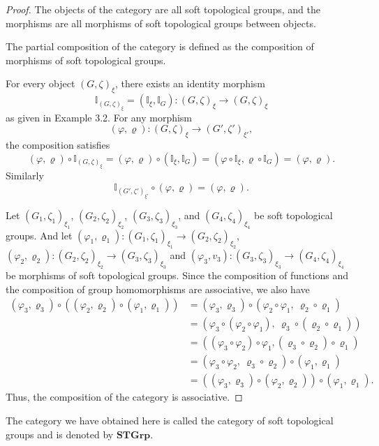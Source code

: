 \documentclass[preprint,12pt]{elsarticle}
\begin{document}
\begin{proof}
 The objects of the category are all soft topological groups, and the morphisms are all morphisms of soft topological groups  between objects.

The partial composition of the category is defined as the composition of morphisms of soft topological groups.

For every object $(G,\zeta)_\xi$, there exists an identity morphism
\[
\mathbb{I}_{ (G,\zeta)_\xi }=(\mathbb{I}_\xi, \mathbb{I}_G) : (G,\zeta)_\xi \longrightarrow (G,\zeta)_\xi
\]
as given in Example 3.2.
For any morphism
\[
(\varphi, \varrho) : (G,\zeta)_\xi  \to ( G',\zeta')_{\xi'} ,
\]
the composition satisfies
\[(\varphi, \varrho) \circ \mathbb{I}_{(G,\zeta)_\xi } = (\varphi, \varrho) \circ(\mathbb{I}_\xi, \mathbb{I}_G)  = (\varphi \circ \mathbb{I}_\xi, \varrho \circ \mathbb{I}_G) = (\varphi, \varrho).\]
Similarly
\[\mathbb{I}_{( G',\zeta')_{\xi'}} \circ (\varphi, \varrho) =(\varphi, \varrho).\]

 Let  \( (G_1,\zeta_1 )_{\xi_1} \), \( (G_2,\zeta_2 )_{\xi_2} \), \( (G_3,\zeta_3 )_{\xi_3} \), and \( (G_4,\zeta_4 )_{\xi_4}\) be soft topological groups. And let
\(
(\varphi_1, \varrho_1) : (G_1,\zeta_1 )_{\xi_1}  \rightarrow(G_2,\zeta_2 )_{\xi_2} \),
\((\varphi_2, \varrho_2) : (G_2,\zeta_2 )_{\xi_2} \rightarrow (G_3,\zeta_3 )_{\xi_3}\) and \((\varphi_3, v_3) :(G_3,\zeta_3 )_{\xi_3}\rightarrow (G_4,\zeta_4 )_{\xi_4}
\)
be  morphisms of soft topological groups.
Since the composition of functions  and the composition of group homomorphisms  are associative, we also have
\begin{align*}
 (\varphi_3, \varrho_3) \circ \left((\varphi_2, \varrho_2) \circ (\varphi_1, \varrho_1)\right)
&= (\varphi_3, \varrho_3) \circ (\varphi_2 \circ \varphi_1,\ \varrho_2 \circ \varrho_1) \\
&=(\varphi_3 \circ (\varphi_2 \circ \varphi_1),\ \varrho_3 \circ (\varrho_2 \circ \varrho_1))\\
&= ((\varphi_3 \circ \varphi_2) \circ \varphi_1,( \varrho_3 \circ \varrho_2) \circ \varrho_1)  \\
&= (\varphi_3 \circ \varphi_2,\ \varrho_3 \circ \varrho_2) \circ (\varphi_1, \varrho_1)\\
&=((\varphi_3, \varrho_3)\circ(\varphi_2, \varrho_2))\circ (\varphi_1, \varrho_1).
\end{align*}
Thus, the composition of the category is associative.

\end{proof}
The category we have obtained here is called the category of soft topological groups and is denoted by $\mathbf{STGrp}$.
\end{document}

